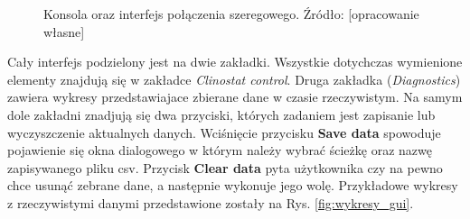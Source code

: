 \begin{figure}[h]
	
	\centering
	\setlength{\fboxsep}{0pt}
	\setlength{\fboxrule}{1pt}
	\caption{Konsola oraz interfejs połączenia szeregowego. Źródło: [opracowanie własne]} 
	\label{fig:konsola_gui}
	
\end{figure}

Cały interfejs podzielony jest na dwie zakładki. Wszystkie dotychczas wymienione elementy znajdują się w zakładce \textit{Clinostat control}. Druga zakładka (\textit{Diagnostics}) zawiera wykresy przedstawiajace zbierane dane w czasie rzeczywistym. Na samym dole zakładni znadjują się dwa przyciski, których zadaniem jest zapisanie lub wyczyszczenie aktualnych danych. Wciśnięcie przycisku \textbf{Save data} spowoduje pojawienie się okna dialogowego w którym należy wybrać ścieżkę oraz nazwę zapisywanego pliku csv. Przycisk \textbf{Clear data} pyta użytkownika czy na pewno chce usunąć zebrane dane, a następnie wykonuje jego wolę. Przykładowe wykresy z rzeczywistymi danymi przedstawione zostały na Rys. \ref{fig:wykresy_gui}.


